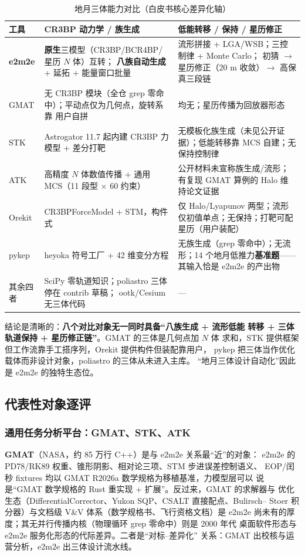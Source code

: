 \begin{table}[htbp]
\centering\small
\caption{地月三体能力对比（白皮书核心差异化轴）}
\label{tab:threebody}
\begin{tabularx}{\textwidth}{@{}lXX@{}}
\toprule
\textbf{工具} & \textbf{CR3BP 动力学 / 族生成} & \textbf{低能转移 / 保持 / 星历修正} \\
\midrule
\textbf{e2m2e} & \textbf{原生}三模型（CR3BP/BCR4BP/星历 $N$ 体）互转；
\textbf{八族自动生成} + 延拓 + 能量窗口批量 &
流形拼接 + LGA/WSB；三控制律 + Monte Carlo；
初猜 $\to$ 星历修正（20 m 收敛）$\to$ 高保真三段链 \\
GMAT & 无 CR3BP 模块（全仓 grep 零命中）；平动点仅为几何点，旋转系靠
用户自拼 & 均无；星历传播为回放器形态 \\
STK & Astrogator 11.7 起内建 CR3BP 力模型 + 差分打靶 &
无模板化族生成（未见公开证据）；低能转移靠 MCS 自建；无保持控制律 \\
ATK & 高精度 $N$ 体数值传播 + 通用 MCS（11 段型 $\times$ 60 约束）&
公开材料未宣称族生成/流形；有复现 GMAT 算例的 Halo 维持论文证据 \\
Orekit & CR3BPForceModel + STM，构件式 &
仅 Halo/Lyapunov 两型；流形仅初值单点；无保持；打靶可配星历（用户装配） \\
pykep & heyoka 符号工厂 + 42 维变分方程 &
无族生成（grep 零命中）；无流形；14 个地月低推力\textbf{基准题}——
其输入恰是 e2m2e 的产出物 \\
其余四者 & SciPy 零轨道知识；poliastro 三体停在 contrib 草稿；
ootk/Cesium 无三体代码 & --- \\
\bottomrule
\end{tabularx}
\end{table}

结论是清晰的：\textbf{八个对比对象无一同时具备``八族生成 + 流形低能
转移 + 三体轨道保持 + 星历修正链''}。GMAT 的三体是几何点加 $N$ 体
求和，STK 提供框架但工作流靠手工搭序列，Orekit 提供构件但装配靠用户，
pykep 把三体当作优化载体而非设计对象，poliastro 的三体从未进入主库。
``地月三体设计自动化''因此是 e2m2e 的独特生态位。

\subsection{代表性对象逐评}

\subsubsection{通用任务分析平台：GMAT、STK、ATK}

\textbf{GMAT}（NASA，约 85 万行 C++）是与 e2m2e 关系最``近''的对象：
e2m2e 的 PD78/RK89 权重、锥形阴影、相对论三项、STM 步进误差控制语义、
EOP/闰秒 fixtures 均以 GMAT R2026a 数学规格为移植基准，力模型层可以
说是``GMAT 数学规格的 Rust 重实现 + 扩展''。反过来，GMAT 的求解器与
优化生态（DifferentialCorrector、Yukon SQP、CSALT 直接配点、Bulirsch--
Stoer 积分器）与文档级 V\&V 体系（数学规格书、飞行资格文档）是 e2m2e
尚未有的厚度；其无并行传播内核（物理循环 grep 零命中）则是 2000 年代
桌面软件形态与 e2m2e 服务化形态的代际差异。二者是``对标--差异化''
关系：GMAT 出校核与运营分析，e2m2e 出三体设计流水线。


